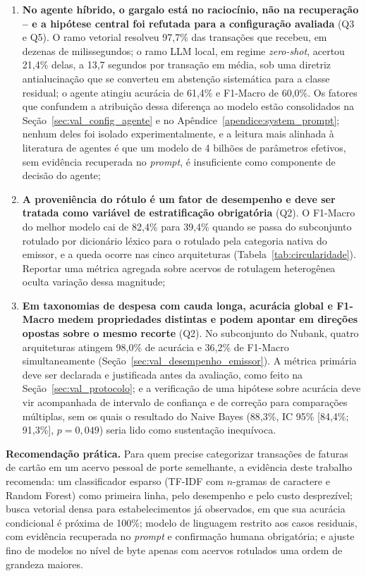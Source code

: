 \begin{enumerate}
	\item \textbf{No agente híbrido, o gargalo está no raciocínio, não na recuperação -- e a hipótese central foi refutada para a configuração avaliada} (Q3 e Q5). O ramo vetorial resolveu 97,7\% das transações que recebeu, em dezenas de milissegundos; o ramo LLM local, em regime \textit{zero-shot}, acertou 21,4\% delas, a 13,7 segundos por transação em média, sob uma diretriz antialucinação que se converteu em abstenção sistemática para a classe residual; o agente atingiu acurácia de 61,4\% e F1-Macro de 60,0\%. Os fatores que confundem a atribuição dessa diferença ao modelo estão consolidados na Seção~\ref{sec:val_config_agente} e no Apêndice~\ref{apendice:system_prompt}; nenhum deles foi isolado experimentalmente, e a leitura mais alinhada à literatura de agentes é que um modelo de 4 bilhões de parâmetros efetivos, sem evidência recuperada no \textit{prompt}, é insuficiente como componente de decisão do agente;

	\item \textbf{A proveniência do rótulo é um fator de desempenho e deve ser tratada como variável de estratificação obrigatória} (Q2). O F1-Macro do melhor modelo cai de 82,4\% para 39,4\% quando se passa do subconjunto rotulado por dicionário léxico para o rotulado pela categoria nativa do emissor, e a queda ocorre nas cinco arquiteturas (Tabela~\ref{tab:circularidade}). Reportar uma métrica agregada sobre acervos de rotulagem heterogênea oculta variação dessa magnitude;

	\item \textbf{Em taxonomias de despesa com cauda longa, acurácia global e F1-Macro medem propriedades distintas e podem apontar em direções opostas sobre o mesmo recorte} (Q2). No subconjunto do Nubank, quatro arquiteturas atingem 98,0\% de acurácia e 36,2\% de F1-Macro simultaneamente (Seção~\ref{sec:val_desempenho_emissor}). A métrica primária deve ser declarada e justificada antes da avaliação, como feito na Seção~\ref{sec:val_protocolo}; e a verificação de uma hipótese sobre acurácia deve vir acompanhada de intervalo de confiança e de correção para comparações múltiplas, sem os quais o resultado do Naive Bayes (88,3\%, IC 95\% [84,4\%; 91,3\%], $p = 0{,}049$) seria lido como sustentação inequívoca.
\end{enumerate}

\textbf{Recomendação prática.} Para quem precise categorizar transações de faturas de cartão em um acervo pessoal de porte semelhante, a evidência deste trabalho recomenda: um classificador esparso (TF-IDF com $n$-gramas de caractere e Random Forest) como primeira linha, pelo desempenho e pelo custo desprezível; busca vetorial densa para estabelecimentos já observados, em que sua acurácia condicional é próxima de 100\%; modelo de linguagem restrito aos casos residuais, com evidência recuperada no \textit{prompt} e confirmação humana obrigatória; e ajuste fino de modelos no nível de byte apenas com acervos rotulados uma ordem de grandeza maiores.

